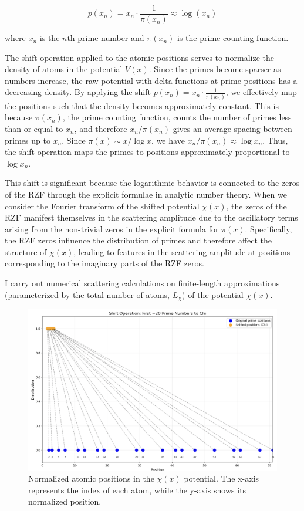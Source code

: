 \documentclass[11pt, oneside]{article}
\begin{document}
\begin{equation}
p(x_n) = x_n \cdot \frac{1}{\pi(x_n)} \approx \log(x_n)
\end{equation}

where $x_n$ is the $n$th prime number and $\pi(x_n)$ is the prime counting function.

The shift operation applied to the atomic positions serves to normalize the density of atoms in the potential $V(x)$. Since the primes become sparser as numbers increase, the raw potential with delta functions at prime positions has a decreasing density. By applying the shift $p(x_n) = x_n \cdot \frac{1}{\pi(x_n)}$, we effectively map the positions such that the density becomes approximately constant. This is because $\pi(x_n)$, the prime counting function, counts the number of primes less than or equal to $x_n$, and therefore $x_n / \pi(x_n)$ gives an average spacing between primes up to $x_n$. Since $\pi(x) \sim x / \log x$, we have $x_n / \pi(x_n) \approx \log x_n$. Thus, the shift operation maps the primes to positions approximately proportional to $\log x_n$.

This shift is significant because the logarithmic behavior is connected to the zeros of the RZF through the explicit formulae in analytic number theory. When we consider the Fourier transform of the shifted potential $\chi(x)$, the zeros of the RZF manifest themselves in the scattering amplitude due to the oscillatory terms arising from the non-trivial zeros in the explicit formula for $\pi(x)$. Specifically, the RZF zeros influence the distribution of primes and therefore affect the structure of $\chi(x)$, leading to features in the scattering amplitude at positions corresponding to the imaginary parts of the RZF zeros.

I carry out numerical scattering calculations on finite-length approximations (parameterized by the total number of atoms, $L_{\chi}$) of the potential $\chi(x)$.

\begin{figure}[htbp]
\begin{center}
    \includegraphics[width=0.8\linewidth]{normalizing.png}
\caption{Normalized atomic positions in the $\chi(x)$ potential. The x-axis represents the index of each atom, while the y-axis shows its normalized position.}
\label{fig:normalized_positions}
\end{center}
\end{figure}
\end{document}
